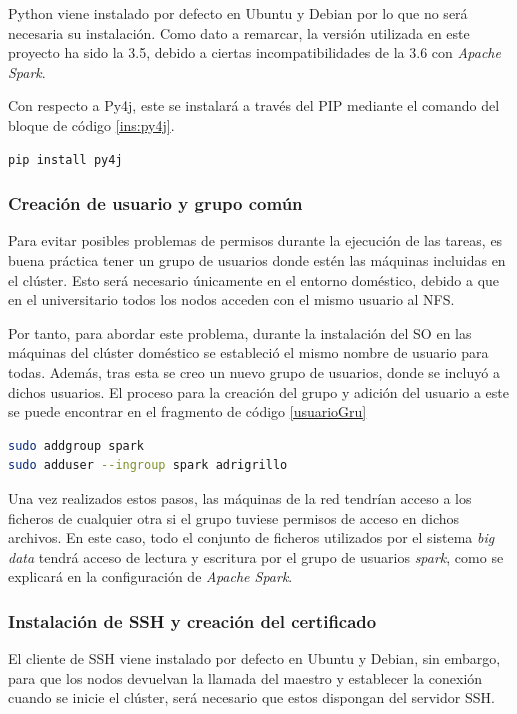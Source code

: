 Python viene instalado por defecto en Ubuntu y Debian por lo que no será necesaria su instalación. Como dato a remarcar, la versión utilizada en este proyecto ha sido la 3.5, debido a ciertas incompatibilidades de la 3.6 con \textit{Apache Spark}.

Con respecto a Py4j, este se instalará a través del \gls{PIP} mediante el comando del bloque de código \ref{ins:py4j}.

\begin{lstlisting}[label=ins:py4j,language=sh,frame=single,caption=Instalación de Py4j]
pip install py4j
\end{lstlisting}

\subsubsection{Creación de usuario y grupo común \label{grupoComun}}
Para evitar posibles problemas de permisos durante la ejecución de las tareas, es buena práctica tener un grupo de usuarios donde estén las máquinas incluidas en el clúster. Esto será necesario únicamente en el entorno doméstico, debido a que en el universitario todos los nodos acceden con el mismo usuario al \gls{NFS}.

Por tanto, para abordar este problema, durante la instalación del \gls{SO} en las máquinas del clúster doméstico se estableció el mismo nombre de usuario para todas. Además, tras esta se creo un nuevo grupo de usuarios, donde se incluyó a dichos usuarios. El proceso para la creación del grupo y adición del usuario a este se puede encontrar en el fragmento de código \ref{usuarioGru}

\begin{lstlisting}[label=usuarioGru,language=sh,frame=single,caption=Creación de grupo común y adición del usuario del sistema a este]
sudo addgroup spark
sudo adduser --ingroup spark adrigrillo
\end{lstlisting}

Una vez realizados estos pasos, las máquinas de la red tendrían acceso a los ficheros de cualquier otra si el grupo tuviese permisos de acceso en dichos archivos. En este caso, todo el conjunto de ficheros utilizados por el sistema \textit{big data} tendrá acceso de lectura y escritura por el grupo de usuarios \textit{spark}, como se explicará en la configuración de \textit{Apache Spark}.

\subsubsection{Instalación de \gls{SSH} y creación del certificado \label{insSSH}}
El cliente de \gls{SSH} viene instalado por defecto en Ubuntu y Debian, sin embargo, para que los nodos devuelvan la llamada del maestro y establecer la conexión cuando se inicie el clúster, será necesario que estos dispongan del servidor \gls{SSH}. 

